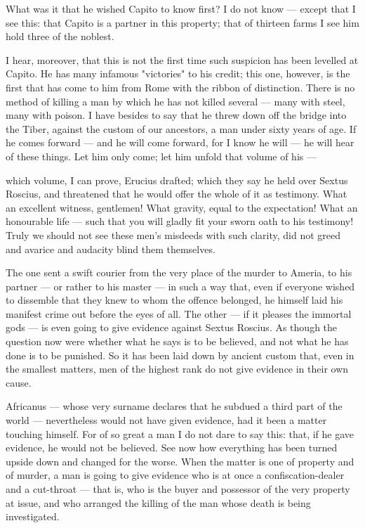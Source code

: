  What was it that he wished Capito to know first? I do not know --- except that I see this: that Capito is a partner in this property; that of thirteen farms I see him hold three of the noblest.

 I hear, moreover, that this is not the first time such suspicion has been levelled at Capito. He has many infamous "victories" to his credit; this one, however, is the first that has come to him from Rome with the ribbon of distinction. There is no method of killing a man by which he has not killed several --- many with steel, many with poison. I have besides to say that he threw down off the bridge into the Tiber, against the custom of our ancestors, a man under sixty years of age. If he comes forward --- and he will come forward, for I know he will --- he will hear of these things. Let him only come; let him unfold that volume of his ---

 which volume, I can prove, Erucius drafted; which they say he held over Sextus Roscius, and threatened that he would offer the whole of it as testimony. What an excellent witness, gentlemen! What gravity, equal to the expectation! What an honourable life --- such that you will gladly fit your sworn oath to his testimony! Truly we should not see these men's misdeeds with such clarity, did not greed and avarice and audacity blind them themselves.

 The one sent a swift courier from the very place of the murder to Ameria, to his partner --- or rather to his master --- in such a way that, even if everyone wished to dissemble that they knew to whom the offence belonged, he himself laid his manifest crime out before the eyes of all. The other --- if it pleases the immortal gods --- is even going to give evidence against Sextus Roscius. As though the question now were whether what he says is to be believed, and not what he has done is to be punished. So it has been laid down by ancient custom that, even in the smallest matters, men of the highest rank do not give evidence in their own cause.

 Africanus --- whose very surname declares that he subdued a third part of the world --- nevertheless would not have given evidence, had it been a matter touching himself. For of so great a man I do not dare to say this: that, if he gave evidence, he would not be believed. See now how everything has been turned upside down and changed for the worse. When the matter is one of property and of murder, a man is going to give evidence who is at once a confiscation-dealer and a cut-throat --- that is, who is the buyer and possessor of the very property at issue, and who arranged the killing of the man whose death is being investigated.

